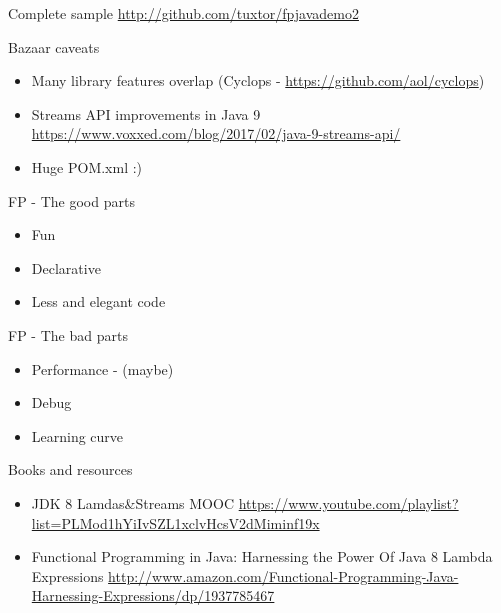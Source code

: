 \documentclass[14pt]{beamer}
\begin{document}
\begin{frame}{Complete sample}
	\url{http://github.com/tuxtor/fpjavademo2}
\end{frame}

\begin{frame}{Bazaar caveats}
    \begin{itemize}
        \item Many library features overlap (Cyclops - \url{https://github.com/aol/cyclops})
        \item Streams API improvements in Java 9 \url{https://www.voxxed.com/blog/2017/02/java-9-streams-api/}
        \item Huge POM.xml :)
     \end{itemize}
\end{frame}

\begin{frame}{FP - The good parts}
	\begin{itemize}
	\item Fun
	\item Declarative
	\item Less and elegant code
	\end{itemize}
\end{frame}

\begin{frame}{FP - The bad parts}
	\begin{itemize}
	\item Performance - (maybe)
	\item Debug
	\item Learning curve
	\end{itemize}
\end{frame}

\begin{frame}{Books and resources}
	\begin{itemize}
	\item JDK 8 Lamdas\&Streams MOOC {\scriptsize \url{https://www.youtube.com/playlist?list=PLMod1hYiIvSZL1xclvHcsV2dMiminf19x}}
	\item Functional Programming in Java: Harnessing the Power Of Java 8 Lambda Expressions \scriptsize\url{http://www.amazon.com/Functional-Programming-Java-Harnessing-Expressions/dp/1937785467}
	\end{itemize}
\end{frame}
\end{document}
